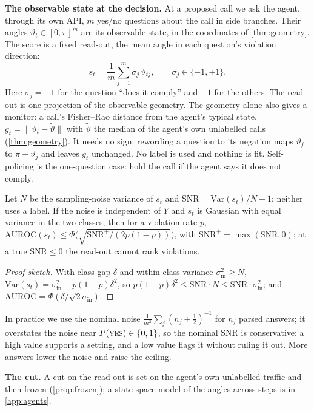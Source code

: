 \textbf{The observable state at the decision.} At a proposed call we ask the agent, through its own API, $m$ yes/no questions about the call in side branches. Their angles $\vartheta_t\in[0,\pi]^m$ are its observable state, in the coordinates of \cref{thm:geometry}. The score is a fixed read-out, the mean angle in each question's violation direction:
\begin{equation}\label{eq:readout} s_t=\frac1m\sum_{j=1}^{m}\sigma_j\,\vartheta_{tj},\qquad \sigma_j\in\{-1,+1\}. \end{equation}
Here $\sigma_j=-1$ for the question ``does it comply'' and $+1$ for the others. The read-out is one projection of the observable geometry. The geometry alone also gives a monitor: a call's Fisher--Rao distance from the agent's typical state, $g_t=\|\vartheta_t-\tilde\vartheta\|$ with $\tilde\vartheta$ the median of the agent's own unlabelled calls (\cref{thm:geometry}). It needs no sign: rewording a question to its negation maps $\vartheta_j$ to $\pi-\vartheta_j$ and leaves $g_t$ unchanged. No label is used and nothing is fit. Self-policing is the one-question case: hold the call if the agent says it does not comply.
\begin{proposition}\label{prop:snrceil}
Let $N$ be the sampling-noise variance of $s_t$ and $\mathrm{SNR}=\mathrm{Var}(s_t)/N-1$; neither uses a label. If the noise is independent of $Y$ and $s_t$ is Gaussian with equal variance in the two classes, then for a violation rate $p$,
$\mathrm{AUROC}(s_t)\le\Phi\big(\sqrt{\mathrm{SNR}^+/(2p(1-p))}\big)$, with $\mathrm{SNR}^+=\max(\mathrm{SNR},0)$; at a true $\mathrm{SNR}\le0$ the read-out cannot rank violations.
\end{proposition}
\begin{proof}[Proof sketch]
With class gap $\delta$ and within-class variance $\sigma_{\mathrm{in}}^2\ge N$, $\mathrm{Var}(s_t)=\sigma_{\mathrm{in}}^2+p(1-p)\delta^2$, so $p(1-p)\delta^2\le\mathrm{SNR}\cdot N\le\mathrm{SNR}\cdot\sigma_{\mathrm{in}}^2$; and $\mathrm{AUROC}=\Phi(\delta/\sqrt2\sigma_{\mathrm{in}})$.
\end{proof}
In practice we use the nominal noise $\frac1{m^2}\sum_j(n_j+\frac12)^{-1}$ for $n_j$ parsed answers; it overstates the noise near $P(\textsc{yes})\in\{0,1\}$, so the nominal SNR is conservative: a high value supports a setting, and a low value flags it without ruling it out. More answers lower the noise and raise the ceiling.

\textbf{The cut.} A cut on the read-out is set on the agent's own unlabelled traffic and then frozen (\cref{prop:frozen}); a state-space model of the angles across steps is in \cref{app:agents}.

